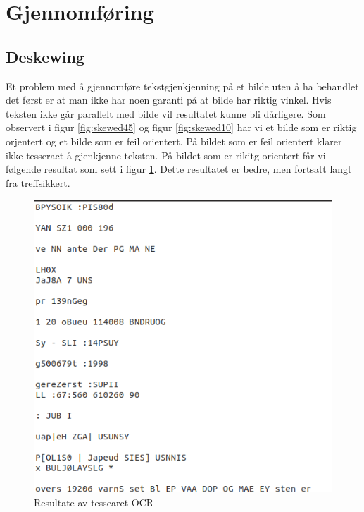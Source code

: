 \documentclass{article}
\begin{document}
\section{Gjennomføring}
\subsection{Deskewing}
Et problem med å gjennomføre tekstgjenkjenning på et bilde uten å ha behandlet det først er at man ikke har noen garanti på at bilde har riktig vinkel. Hvis teksten ikke går parallelt med bilde vil resultatet kunne bli dårligere. Som observert i figur \ref{fig:skewed45} og figur \ref{fig:skewed10} har vi et bilde som er riktig orjentert og et bilde som er feil orientert. På bildet som er feil orientert klarer ikke tesseract å gjenkjenne teksten. På bildet som er rikitg orientert får vi følgende resultat som sett i figur \ref{fig:skewed10result}. Dette resultatet er bedre, men fortsatt langt fra treffsikkert.


\begin{figure}[h]
\centering
\includegraphics[scale=0.6]{images/skewed10results}
\caption{Resultate av tessearct OCR}
\label{fig:skewed10result}
\end{figure}
\end{document}
